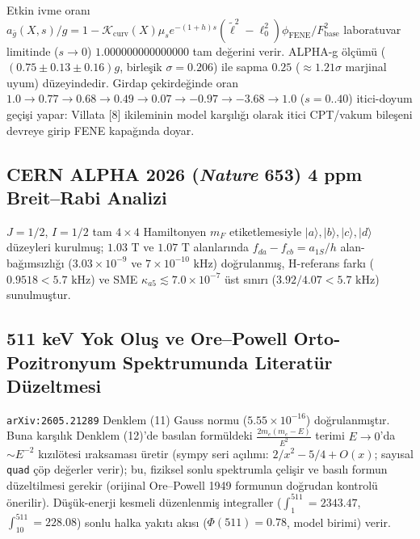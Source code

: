 \documentclass[12pt,a4paper]{article}
\begin{document}
Etkin ivme oranı $a_{\bar{g}}(X,s)/g = 1 - \mathcal{K}_{\mathrm{curv}}(X) \mu_s e^{-(1+h)s} (\tilde{\ell}^2-\ell_0^2)\phi_{\mathrm{FENE}}/F_{\mathrm{base}}^2$ laboratuvar limitinde ($s \to 0$) $1.000000000000000$ tam değerini verir. ALPHA-g ölçümü ($(0.75 \pm 0.13 \pm 0.16)g$, birleşik $\sigma = 0.206$) ile sapma $0.25$ ($\approx 1.21\sigma$ marjinal uyum) düzeyindedir. Girdap çekirdeğinde oran $1.0 \to 0.77 \to 0.68 \to 0.49 \to 0.07 \to -0.97 \to -3.68 \to 1.0$ ($s = 0..40$) itici-doyum geçişi yapar: Villata [8] ikileminin model karşılığı olarak itici CPT/vakum bileşeni devreye girip FENE kapağında doyar.

\subsection{CERN ALPHA 2026 (\textit{Nature} 653) 4 ppm Breit--Rabi Analizi}

$J=1/2$, $I=1/2$ tam $4\times 4$ Hamiltonyen $m_F$ etiketlemesiyle $|a\rangle,|b\rangle,|c\rangle,|d\rangle$ düzeyleri kurulmuş; $1.03\text{ T}$ ve $1.07\text{ T}$ alanlarında $f_{da}-f_{cb} = a_{1S}/h$ alan-bağımsızlığı ($3.03 \times 10^{-9}$ ve $7 \times 10^{-10}\text{ kHz}$) doğrulanmış, H-referans farkı ($0.9518 < 5.7\text{ kHz}$) ve SME $\kappa_{a5} \lesssim 7.0 \times 10^{-7}$ üst sınırı ($3.92/4.07 < 5.7\text{ kHz}$) sunulmuştur.

\subsection{511 keV Yok Oluş ve Ore--Powell Orto-Pozitronyum Spektrumunda Literatür Düzeltmesi}

\texttt{arXiv:2605.21289} Denklem (11) Gauss normu ($5.55 \times 10^{-16}$) doğrulanmıştır. Buna karşılık Denklem (12)'de basılan formüldeki $\frac{2m_e(m_e-E)}{E^2}$ terimi $E \to 0$'da $\sim E^{-2}$ kızılötesi ıraksaması üretir (sympy seri açılımı: $2/x^2 - 5/4 + O(x)$; sayısal \texttt{quad} çöp değerler verir); bu, fiziksel sonlu spektrumla çelişir ve basılı formun düzeltilmesi gerekir (orijinal Ore--Powell 1949 formunun doğrudan kontrolü önerilir). Düşük-enerji kesmeli düzenlenmiş integraller ($\int_1^{511} = 2343.47$, $\int_{10}^{511} = 228.08$) sonlu halka yakıtı akısı ($\Phi(511) = 0.78$, model birimi) verir.
\end{document}
